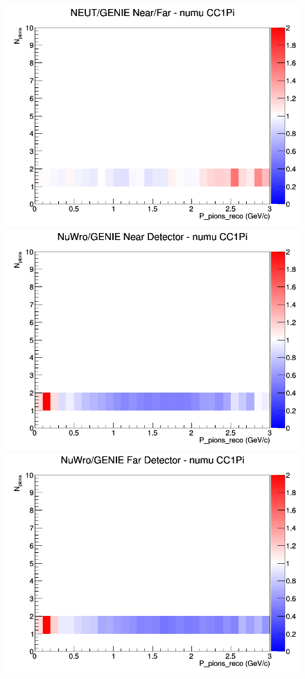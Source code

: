 \documentclass[12pt]{article}
\begin{document}
\begin{figure}[h]
\endminipage
{}
\includegraphics[width=\linewidth]{eff_N_P/GAr/pions/ratios/CC1Pi_NEUT_GENIE_numu_NF_N_P.png}
\endminipage
\newline
{}
\includegraphics[width=\linewidth]{eff_N_P/GAr/pions/ratios/CC1Pi_NuWro_GENIE_numu_near_N_P.png}
\endminipage
{}
\includegraphics[width=\linewidth]{eff_N_P/GAr/pions/ratios/CC1Pi_NuWro_GENIE_numu_far_N_P.png}

\end{figure}
\end{document}
